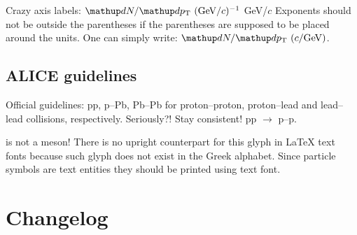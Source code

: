 \documentclass[12pt,a4paper]{article}
\begin{document}
Crazy axis labels: \( \dd N/\dd p_\tn{T}\ (\tn{GeV}/c)^{-1} \) GeV/$c$
Exponents should not be outside the parentheses if the parentheses are supposed to be placed around the units. One can simply write: \( \dd N/\dd p_\tn{T}\ (c/\tn{GeV}) \).

\subsection{ALICE guidelines}

Official guidelines: pp, p--Pb, Pb--Pb for proton--proton, proton--lead and lead--lead collisions, respectively. Seriously?!
Stay consistent! pp \( \rightarrow \) p--p.

\ml{\phi} is not a meson!
There is no upright counterpart for this glyph in \LaTeX{} text fonts because such glyph does not exist in the Greek alphabet.
Since particle symbols are text entities they should be printed using text font.

\appendix

\section{Changelog}




\end{document}

